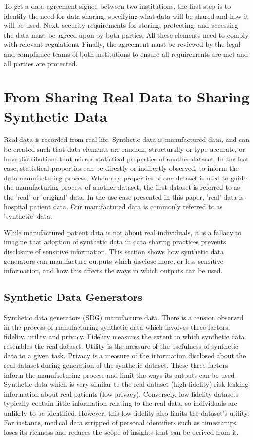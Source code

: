 \documentclass[11pt]{article}
\begin{document}
To get a data agreement signed between two institutions, the first step is to identify the need for data sharing, specifying what data will be shared and how it will be used. Next, security requirements for storing, protecting, and accessing the data must be agreed upon by both parties. All these elements need to comply with relevant regulations. Finally, the agreement must be reviewed by the legal and compliance teams of both institutions to ensure all requirements are met and all parties are protected.

\section{From Sharing Real Data to Sharing Synthetic Data}
Real data is recorded from real life. Synthetic data is manufactured data, and can be created such that data elements are random, structurally or type accurate, or have distributions that mirror statistical properties of another dataset. In the last case, statistical properties can be directly or indirectly observed, to inform the data manufacturing process. When any properties of one dataset is used to guide the manufacturing process of another dataset, the first dataset is referred to as the 'real' or 'original' data. In the use case presented in this paper, 'real' data is hospital patient data. Our manufactured data is commonly referred to as 'synthetic' data.

While manufactured patient data is not about real individuals, it is a fallacy to imagine that adoption of synthetic data in data sharing practices prevents disclosure of sensitive information. This section shows how synthetic data generators can manufacture outputs which disclose more, or less sensitive information, and how this affects the ways in which outputs can be used.

\subsection{Synthetic Data Generators}

Synthetic data generators (SDG) manufacture data. There is a tension observed in the process of manufacturing synthetic data which involves three factors: fidelity, utility and privacy. Fidelity measures the extent to which synthetic data resembles the real dataset. Utility is the measure of the usefulness of synthetic data to a given task. Privacy is a measure of the information disclosed about the real dataset during generation of the synthetic dataset. These three factors inform the manufacturing process and limit the ways its outputs can be used. Synthetic data which is very similar to the real dataset (high fidelity) risk leaking information about real patients (low privacy). Conversely, low fidelity datasets typically contain little information relating to the real data, so individuals are unlikely to be identified. However, this low fidelity also limits the dataset's utility. For instance, medical data stripped of personal identifiers such as timestamps loses its richness and reduces the scope of insights that can be derived from it.
\end{document}
